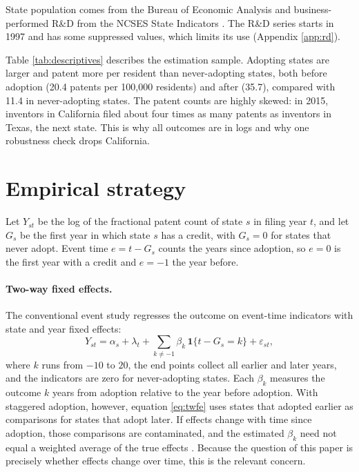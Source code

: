 \documentclass[12pt]{article}
\begin{document}
State population comes from the Bureau of Economic Analysis \citep{bea2026regional} and business-performed R\&D
from the NCSES State Indicators \citep{ncses2026state}. The R\&D series starts in 1997 and has some suppressed
values, which limits its use (Appendix \ref{app:rd}).

Table \ref{tab:descriptives} describes the estimation sample. Adopting states are larger and patent more per
resident than never-adopting states, both before adoption (20.4 patents per 100,000 residents) and after (35.7),
compared with 11.4 in never-adopting states. The patent counts are highly skewed: in 2015, inventors in California
filed about four times as many patents as inventors in Texas, the next state. This is why all outcomes are in logs and why one robustness check
drops California.

{\setlength{\tabcolsep}{4pt}}

\section{Empirical strategy}\label{sec:method}

Let $Y_{st}$ be the log of the fractional patent count of state $s$ in filing year $t$, and let $G_s$ be the
first year in which state $s$ has a credit, with $G_s = 0$ for states that never adopt. Event time
$e = t - G_s$ counts the years since adoption, so $e=0$ is the first year with a credit and $e=-1$ the year
before.

\paragraph{Two-way fixed effects.} The conventional event study regresses the outcome on event-time indicators
with state and year fixed effects:
\begin{equation}\label{eq:twfe}
Y_{st} = \alpha_s + \lambda_t + \sum_{k \neq -1} \beta_k \, \mathbf{1}\{t - G_s = k\} + \varepsilon_{st},
\end{equation}
where $k$ runs from $-10$ to $20$, the end points collect all earlier and later years, and the indicators are
zero for never-adopting states. Each $\beta_k$ measures the outcome $k$ years from adoption relative to the year
before adoption. With staggered adoption, however, equation \eqref{eq:twfe} uses states that adopted earlier as
comparisons for states that adopt later. If effects change with time since adoption, those comparisons are
contaminated, and the estimated $\beta_k$ need not equal a weighted average of the true effects
\citep{goodmanbacon2021difference,roth2023trending}. Because the question of this paper is precisely whether
effects change over time, this is the relevant concern.
\end{document}
